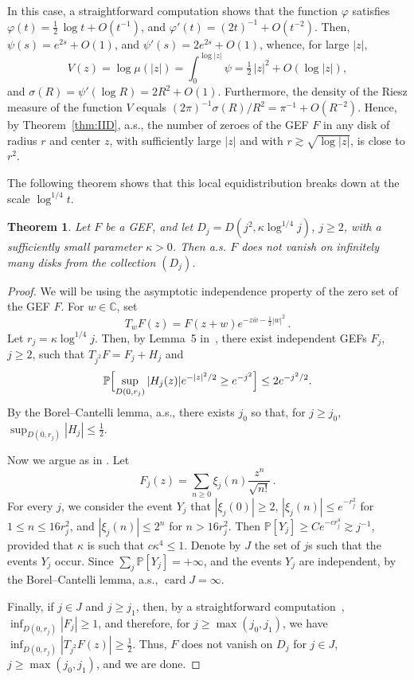 \documentclass[11pt]{amsart}
\numberwithin{equation}{section}
\newtheorem{theorem}{Theorem}
\newcommand{\card}{\operatorname{card}}
\newcommand{\bC}{\mathbb C}
\newcommand{\bP}{\mathbb P}
\begin{document}
In this case, a straightforward computation shows that the function $\varphi$ satisfies
$ \varphi (t) = \tfrac12\, \log t + O(t^{-1})$, and $\varphi'(t) = (2t)^{-1} + O(t^{-2})$.
Then,
$ \psi (s) = e^{2s} + O(1)$, and $\psi'(s) = 2e^{2s} + O(1)$,
whence, for large $|z|$,
\[ V(z) = \log\mu (|z|) =  \displaystyle \int_0^{\log |z|}\psi = \tfrac12\, |z|^2 + O(\log |z|),\]
and $\sigma (R) = \psi'(\log R) = 2R^2 + O(1)$.
Furthermore, the density of the Riesz measure of the function $V$ equals
$(2\pi)^{-1}\sigma (R)/R^2 = \pi^{-1} + O(R^{-2})$.
Hence, by Theorem~\ref{thm:IID}, a.s.,
the number of zeroes of the GEF $F$ in any disk of radius
$r$ and center $z$, with sufficiently large $|z|$ and with $r\gtrsim \sqrt{\log |z|}$,
is close to $r^2$.

The following theorem shows that this local equidistribution breaks down at the scale $\log^{1/4} t$.

\begin{theorem}\label{thm:IID-example}
Let $F$ be a GEF, and let $D_j=D(j^2, \kappa \log^{1/4}j)$, $j\ge 2$,
with a sufficiently small parameter $\kappa>0$.
Then a.s. $F$ does not vanish on infinitely many disks from the collection $(D_j)$.
\end{theorem}

\begin{proof}
We will be using the asymptotic independence property of the zero set of the GEF $F$.
For $w\in\bC$, set
\[
T_w F (z) =  F(z+w) e^{-z\bar w - \frac12 |w|^2}\,.
\]
Let $r_j=\kappa \log^{1/4}j$. Then, by Lemma~5 in~\cite{NSV}, there exist independent GEFs
$F_j$, $j\ge 2$, such that
$ T_{j^2} F =F_j+H_j $ and
$$
\mathbb P\Bigl[ \sup_{D(0,r_j)} |H_j(z)|e^{-|z|^2/2}\ge e^{-j^2}\Bigr] \le 2e^{-j^2/2}.
$$
By the Borel--Cantelli lemma, a.s., there exists $j_0$ so that, for $j\ge j_0$,
$\displaystyle \sup_{D(0,r_j)} |H_j| \le \tfrac12 $.

Now we argue as in \cite[Section~1]{ST3}. Let
$$
F_j(z)=\sum_{n\ge 0}\xi_j(n) \frac{z^n}{\sqrt{n!}}\,.
$$
For every $j$, we consider the event
$Y_j$ that
$|\xi_j(0)|\ge 2$, $|\xi_j(n)|\le e^{-r_j^2}$  for $1\le n\le 16r_j^2$,
and $|\xi_j(n)|\le 2^n$ for $n> 16r_j^2$. Then
$ \mathbb P[Y_j]\ge Ce^{-cr_j^4}\gtrsim j^{-1} $,
provided that $\kappa$ is such that $c\kappa^4\le 1$. Denote by $J$ the set of $j$s
such that the events $Y_j$ occur.
Since $\sum_j \bP[Y_j] = +\infty$, and the events $Y_j$ are independent,
by the Borel--Cantelli lemma, a.s., $\card J=\infty$.

Finally, if $j\in J$ and $j\ge j_1$, then, by a straightforward computation~\cite[Section~1]{ST3},
$ \displaystyle \inf_{D(0, r_j)} |F_j|\ge 1$,
and therefore, for $ j\ge \max(j_0,j_1) $, we have
$ \displaystyle \inf_{D(0, r_j)} |T_{j^2}F(z)|\ge \tfrac12 $.
Thus, $F$ does not vanish on $D_j$ for $j\in J$, $j\ge \max(j_0,j_1)$,
and we are done.
\end{proof}
\end{document}
